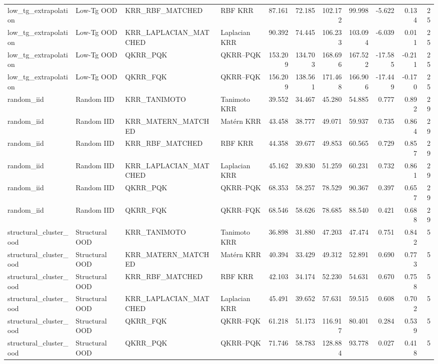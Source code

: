 \begin{tabular}{llllrrrrrrr}
low\_tg\_extrapolation & Low-Tg OOD & KRR\_RBF\_MATCHED & RBF KRR & 87.161 & 72.185 & 102.172 & 99.998 & -5.622 & 0.134 & 25 \\
low\_tg\_extrapolation & Low-Tg OOD & KRR\_LAPLACIAN\_MATCHED & Laplacian KRR & 90.392 & 74.445 & 106.233 & 103.094 & -6.039 & 0.011 & 25 \\
low\_tg\_extrapolation & Low-Tg OOD & QKRR\_PQK & QKRR–PQK & 153.209 & 134.703 & 168.696 & 167.522 & -17.585 & -0.211 & 25 \\
low\_tg\_extrapolation & Low-Tg OOD & QKRR\_FQK & QKRR–FQK & 156.209 & 138.561 & 171.468 & 166.906 & -17.449 & -0.170 & 25 \\
random\_iid & Random IID & KRR\_TANIMOTO & Tanimoto KRR & 39.552 & 34.467 & 45.280 & 54.885 & 0.777 & 0.892 & 29 \\
random\_iid & Random IID & KRR\_MATERN\_MATCHED & Matérn KRR & 43.458 & 38.777 & 49.071 & 59.937 & 0.735 & 0.864 & 29 \\
random\_iid & Random IID & KRR\_RBF\_MATCHED & RBF KRR & 44.358 & 39.677 & 49.853 & 60.565 & 0.729 & 0.857 & 29 \\
random\_iid & Random IID & KRR\_LAPLACIAN\_MATCHED & Laplacian KRR & 45.162 & 39.830 & 51.259 & 60.231 & 0.732 & 0.861 & 29 \\
random\_iid & Random IID & QKRR\_PQK & QKRR–PQK & 68.353 & 58.257 & 78.529 & 90.367 & 0.397 & 0.657 & 29 \\
random\_iid & Random IID & QKRR\_FQK & QKRR–FQK & 68.546 & 58.626 & 78.685 & 88.540 & 0.421 & 0.688 & 29 \\
structural\_cluster\_ood & Structural OOD & KRR\_TANIMOTO & Tanimoto KRR & 36.898 & 31.880 & 47.203 & 47.474 & 0.751 & 0.842 & 5 \\
structural\_cluster\_ood & Structural OOD & KRR\_MATERN\_MATCHED & Matérn KRR & 40.394 & 33.429 & 49.312 & 52.891 & 0.690 & 0.773 & 5 \\
structural\_cluster\_ood & Structural OOD & KRR\_RBF\_MATCHED & RBF KRR & 42.103 & 34.174 & 52.230 & 54.631 & 0.670 & 0.758 & 5 \\
structural\_cluster\_ood & Structural OOD & KRR\_LAPLACIAN\_MATCHED & Laplacian KRR & 45.491 & 39.652 & 57.631 & 59.515 & 0.608 & 0.702 & 5 \\
structural\_cluster\_ood & Structural OOD & QKRR\_FQK & QKRR–FQK & 61.218 & 51.173 & 116.917 & 80.401 & 0.284 & 0.539 & 5 \\
structural\_cluster\_ood & Structural OOD & QKRR\_PQK & QKRR–PQK & 71.746 & 58.783 & 128.884 & 93.778 & 0.027 & 0.418 & 5 \\
\bottomrule
\end{tabular}
